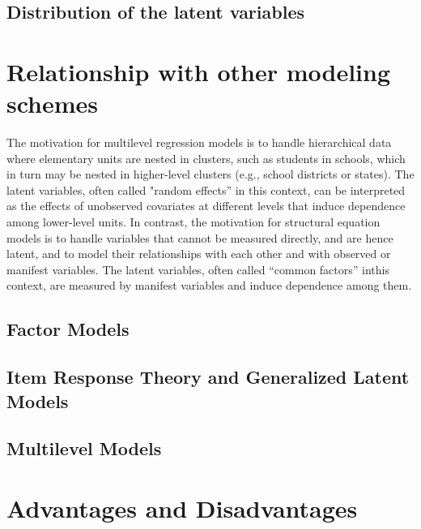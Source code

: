 \subsection{Distribution of the latent variables}



\section{Relationship with other modeling schemes}

\citet{Rabe_et_al_2012}

{\color{red} The motivation for multilevel regression models is to handle hierarchical data where elementary units are nested in clusters, such as students in schools, which in
turn may be nested in higher-level clusters (e.g., school districts or states). The latent variables, often called "random effects” in this context, can be interpreted as
the effects of unobserved covariates at different levels that induce dependence among lower-level units. In contrast, the motivation for structural equation models is to
handle variables that cannot be measured directly, and are hence latent, and to model their relationships with each other and with observed or manifest variables.
The latent variables, often called “common factors” inthis context, are measured by manifest variables and induce dependence among them.}


\subsection{Factor Models}

\subsection{Item Response Theory and Generalized Latent Models}

\subsection{Multilevel Models}



\section{Advantages and Disadvantages}